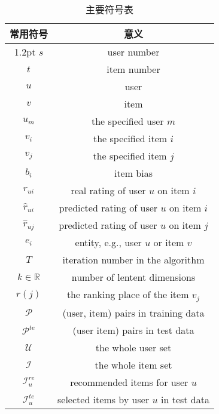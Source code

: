 \begin{table}[htbp]%
	\setlength\tabcolsep{2pt}
	\renewcommand\arraystretch{1.3}%
	\caption{主要符号表}
	\label{tab1}
	\begin{center}
		
		\begin{tabular}{cc}
			
			\Xhline{1.2pt}
			常用符号                    & 意义\\
			\hline{1.2pt}
			$s$                         & user number \\
			$t$                         & item number \\
			$u$                         & user \\
			$v$                         & item \\
			$u_m$                       & the specified user $m$\\
			$v_i$                       & the specified item $i$\\
			$v_j$                       & the specified item $j$ \\
			$b_i$                       & item bias \\
			${r}_{ui}$                  & real rating of user $u$ on item $i$\\
			$\hat{r}_{ui}$              & predicted rating of user $u$ on item $i$\\
			$\hat{r}_{uj}$              & predicted rating of user $u$ on item $j$\\
			$e_i$                       & entity, e.g., user $u$ or item $v$\\ 
			$T$                         & iteration number in the algorithm\\
			$k \in \mathbb{R}$          & number of lentent dimensions \\
			$r\left(j\right)$           & the ranking place of the item $v_j$\\
			$\mathcal{P}$               & (user, item) pairs in training data \\
			$\mathcal{P}^{te}$          & (user item) pairs in test data\\ 
			$\mathcal{U}$               & the whole user set\\
			$\mathcal{I}$               & the whole item set \\
			$\mathcal{I}_u^{re}$        & recommended items for user $u$\\
			$\mathcal{I}_u^{te}$        & selected items by user $u$ in test data\\

\end{tabular}
\end{center}
\end{table}
